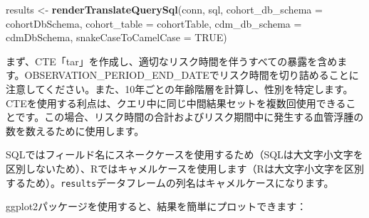 \documentclass[
  11pt]{book}
\newenvironment{Shaded}{\begin{snugshade}}{\end{snugshade}}
\newcommand{\AttributeTok}[1]{\textcolor[rgb]{0.13,0.29,0.53}{#1}}
\newcommand{\CommentTok}[1]{\textcolor[rgb]{0.56,0.35,0.01}{\textit{#1}}}
\newcommand{\ConstantTok}[1]{\textcolor[rgb]{0.56,0.35,0.01}{#1}}
\newcommand{\DecValTok}[1]{\textcolor[rgb]{0.00,0.00,0.81}{#1}}
\newcommand{\FunctionTok}[1]{\textcolor[rgb]{0.13,0.29,0.53}{\textbf{#1}}}
\newcommand{\NormalTok}[1]{#1}
\newcommand{\OtherTok}[1]{\textcolor[rgb]{0.56,0.35,0.01}{#1}}
\newcommand{\SpecialCharTok}[1]{\textcolor[rgb]{0.81,0.36,0.00}{\textbf{#1}}}
\newcommand{\StringTok}[1]{\textcolor[rgb]{0.31,0.60,0.02}{#1}}
\theoremstyle{definition}
\theoremstyle{definition}
\theoremstyle{definition}
\theoremstyle{definition}
\theoremstyle{remark}
\begin{document}
\begin{Shaded}
\begin{Highlighting}[]
\NormalTok{results }\OtherTok{\textless{}{-}} \FunctionTok{renderTranslateQuerySql}\NormalTok{(conn, sql,}
                                   \AttributeTok{cohort\_db\_schema =}\NormalTok{ cohortDbSchema,}
                                   \AttributeTok{cohort\_table =}\NormalTok{ cohortTable,}
                                   \AttributeTok{cdm\_db\_schema =}\NormalTok{ cdmDbSchema,}
                                   \AttributeTok{snakeCaseToCamelCase =} \ConstantTok{TRUE}\NormalTok{)}
\end{Highlighting}
\end{Shaded}

まず、CTE「tar」を作成し、適切なリスク時間を伴うすべての暴露を含めます。OBSERVATION\_PERIOD\_END\_DATEでリスク時間を切り詰めることに注意してください。また、10年ごとの年齢階層を計算し、性別を特定します。CTEを使用する利点は、クエリ中に同じ中間結果セットを複数回使用できることです。この場合、リスク時間の合計およびリスク期間中に発生する血管浮腫の数を数えるために使用します。

SQLではフィールド名にスネークケースを使用するため（SQLは大文字小文字を区別しないため）、Rではキャメルケースを使用します（Rは大文字小文字を区別するため）。\texttt{results}データフレームの列名はキャメルケースになります。

ggplot2パッケージを使用すると、結果を簡単にプロットできます：

\begin{Shaded}
\end{Shaded}
\end{document}
